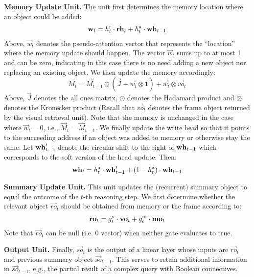 \smallskip

\noindent\textbf{Memory Update Unit.}
The unit first determines the memory location where an object could be added:
\[ \mathbf{w}_t = h^{\mathrm{r}}_t \cdot \mathbf{rh}_t + h^{\mathrm{a}}_t \cdot \mathbf{wh}_{t-1} \]
Above, $\vec{w}_t$ denotes the pseudo-attention vector that represents the ``location'' where the memory update should happen.
The vector $\vec{w}_t$ sums up to at most 1 and can be zero, indicating in this case there is no need adding a new object nor replacing an existing object.
We then update the memory accordingly:
\[ \vec{M}_t = \vec{M}_{t-1} \odot (\vec{J} - \vec{w}_t  \otimes \mathbf{1}) + \vec{w}_t  \otimes \vec{vo}_t\]
Above, $\vec{J}$ denotes the all ones matrix, $\odot$ denotes the Hadamard product and $\otimes$ denotes the Kronecker product
(Recall that $\vec{vo}_t$ denotes the frame object returned by the visual retrieval unit).
Note that the memory is unchanged in the case where $\vec{w}_t = 0$, i.e., $\vec{M}_t = \vec{M}_{t-1}$.
We finally update the write head so that it points to the succeeding address if an object was added to memory or otherwise stay the same.
Let $\mathbf{wh}'_{t-1}$ denote the circular shift to the right of $\mathbf{wh}_{t-1}$ which corresponds to the soft version of the head update.
Then:
\[ \mathbf{wh}_t = h^{\mathrm{a}}_t \cdot \mathbf{wh}'_{t-1} + (1-h^{\mathrm{a}}_t) \cdot \mathbf{wh}_{t-1} \]


\noindent\textbf{Summary Update Unit.}
This unit updates the (recurrent) summary object to equal the outcome of the $t$-th reasoning step.
We first determine whether the relevant object $\vec{ro}_t$ should be obtained from memory or the frame according to:
\[ \mathbf{ro}_t = g^{\mathrm{v}}_t \cdot \mathbf{vo}_t + g^{\mathrm{m}}_t \cdot \mathbf{mo}_t \]
Note that $\vec{ro}_t$ can be null (i.e. 0 vector) when neither gate evaluates to true.

\smallskip

\noindent\textbf{Output Unit.} Finally, $\vec{so}_t$ is the output of a linear layer whose inputs are $\vec{ro}_t$ and previous summary object $\vec{so}_{t-1}$.
This serves to retain additional information in $\vec{so}_{t-1}$, e.g., the partial result of a complex query with Boolean connectives.
